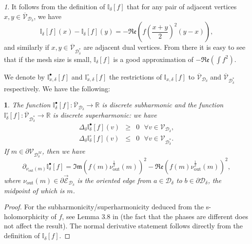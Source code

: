 \documentclass[oneside,english]{amsart}
\numberwithin{equation}{section}
\numberwithin{figure}{section}
\theoremstyle{plain}
\theoremstyle{plain}
\theoremstyle{plain}
\theoremstyle{plain}
\newtheorem{prop}[thm]{\protect\propositionname}
\theoremstyle{plain}
\theoremstyle{definition}
\theoremstyle{remark}
\newtheorem{rem}[thm]{\protect\remarkname}
\providecommand{\propositionname}{Proposition}
\providecommand{\remarkname}{Remark}
\begin{document}
\begin{rem}
\label{rem:integral-square}It follows from the definition of $\mathbb{I}_{\delta}\left[f\right]$
that for any pair of adjacent vertices $x,y\in\overline{\mathcal{V}}_{\mathcal{D}_{\delta}}$,
we have
\[
\mathbb{I}_{\delta}\left[f\right]\left(x\right)-\mathbb{I}_{\delta}\left[f\right]\left(y\right)=-\Re\mathfrak{e}\left(f\left(\frac{x+y}{2}\right)^{2}\left(y-x\right)\right),
\]
and similarly if $x,y\in\overline{\mathcal{V}}_{\mathcal{D}_{\delta}^{*}}$
are adjacent dual vertices. From there it is easy to see that if the
mesh size is small, $\mathbb{I}_{\delta}\left[f\right]$ is a good
approximation of $-\Re\mathfrak{e}\left(\int f^{2}\right)$.
\end{rem}
We denote by $\mathbb{I}_{x,\delta}^{\bullet}\left[f\right]$ and
$\mathbb{I}_{x,\delta}^{\circ}\left[f\right]$ the restrictions of
$\mathbb{I}_{x,\delta}\left[f\right]$ to $\overline{\mathcal{V}}_{\mathcal{D}_{\delta}}$
and $\overline{\mathcal{V}}_{\mathcal{D}_{\delta}^{*}}$ respectively.
We have the following:
\begin{prop}
\label{pro:integral-of-square-sub-super-boundary-values}The function
$\mathbb{I}_{\delta}^{\bullet}\left[f\right]:\overline{\mathcal{V}}_{\mathcal{D}_{\delta}}\to\mathbb{R}$
is discrete subharmonic and the function $\mathbb{I}_{\delta}^{\circ}\left[f\right]:\overline{\mathcal{V}}_{\mathcal{D}_{\delta}^{*}}\to\mathbb{R}$
is discrete superharmonic: we have
\begin{eqnarray*}
\Delta_{\delta}\mathbb{I}_{\delta}^{\bullet}\left[f\right]\left(v\right) & \geq & 0\,\,\,\,\forall v\in\mathcal{V}_{\mathcal{D}_{\delta}},\\
\Delta_{\delta}\mathbb{I}_{\delta}^{\circ}\left[f\right]\left(v\right) & \leq & 0\,\,\,\,\forall v\in\mathcal{V}_{\mathcal{D}_{\delta}^{*}}.
\end{eqnarray*}
If $m\in\partial\mathcal{V}_{\mathcal{D}_{\delta}^{M}}$, then we
have 
\[
\partial_{\nu_{\mathrm{out}}\left(m\right)}\mathbb{I}_{\delta}^{\bullet}\left[f\right]=\Im\mathfrak{m}\left(f\left(m\right)\nu_{\mathrm{out}}^{\frac{1}{2}}\left(m\right)\right)^{2}-\Re\mathfrak{e}\left(f\left(m\right)\nu_{\mathrm{out}}^{\frac{1}{2}}\left(m\right)\right)^{2},
\]
where $\nu_{\mathrm{out}}\left(m\right)\in\partial\vec{\mathcal{E}}_{\mathcal{D}_{\delta}}$
is the oriented edge from $a\in\mathcal{D}_{\delta}$ to $b\in\partial\mathcal{D}_{\delta}$,
the midpoint of which is $m$. \end{prop}
\begin{proof}
For the subharmonicity/superharmonicity deduced from the s-holomorphicity
of $f$, see Lemma 3.8 in \cite{smirnov-ii} (the fact that the phases
are different does not affect the result). The normal derivative statement
follows directly from the definition of $\mathbb{I}_{\delta}\left[f\right]$.
\end{proof}
\end{document}
